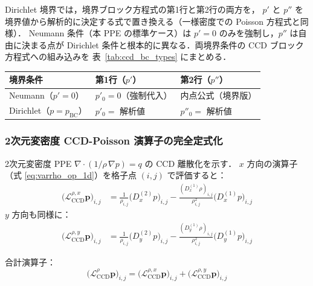 \begin{tcolorbox}[warnbox, title={Dirichlet 境界（$p = p_{\mathrm{BC}}$）の場合との比較}]
Dirichlet 境界では，境界ブロック方程式の第1行と第2行の両方を，
$p'$ と $p''$ を境界値から解析的に決定する式で置き換える（一様密度での Poisson 方程式と同様）．
Neumann 条件（本 PPE の標準ケース）は $p' = 0$ のみを強制し，$p''$ は自由に決まる点が
Dirichlet 条件と根本的に異なる．両境界条件の CCD ブロック方程式への組み込みを
表~\ref{tab:ccd_bc_types} にまとめる．

\begin{center}
\renewcommand{\arraystretch}{1.2}
\begin{tabular}{lll}
\hline
境界条件 & 第1行（$p'$） & 第2行（$p''$） \\
\hline
Neumann（$p'=0$） & $p'_0 = 0$（強制代入） & 内点公式（境界版） \\
Dirichlet（$p=p_{\mathrm{BC}}$） & $p'_0 = $ 解析値 & $p''_0 = $ 解析値 \\
\hline
\end{tabular}
\end{center}
{\captionsetup{hypcap=false}%
%
\label{tab:ccd_bc_types}}
\end{tcolorbox}

\subsubsection{2次元変密度 CCD-Poisson 演算子の完全定式化}
\label{sec:ccd_2d_full}

2次元変密度 PPE $\nabla\cdot(1/\rho\,\nabla p) = q$ の CCD 離散化を示す．
$x$ 方向の演算子（式 \eqref{eq:varrho_op_1d}）を格子点 $(i,j)$ で評価すると：
\begin{align}
  \bigl(\mathcal{L}_{\mathrm{CCD}}^{\rho,x}\bm{p}\bigr)_{i,j}
  &= \frac{1}{\rho_{i,j}}\bigl(D_x^{(2)} p\bigr)_{i,j}
  - \frac{(D_x^{(1)}\rho)_{i,j}}{\rho_{i,j}^2}\bigl(D_x^{(1)} p\bigr)_{i,j}
  \label{eq:Lx_varrho_discrete}
\end{align}
$y$ 方向も同様に：
\begin{align}
  \bigl(\mathcal{L}_{\mathrm{CCD}}^{\rho,y}\bm{p}\bigr)_{i,j}
  &= \frac{1}{\rho_{i,j}}\bigl(D_y^{(2)} p\bigr)_{i,j}
  - \frac{(D_y^{(1)}\rho)_{i,j}}{\rho_{i,j}^2}\bigl(D_y^{(1)} p\bigr)_{i,j}
  \label{eq:Ly_varrho_discrete}
\end{align}

合計演算子：
\begin{equation}
  \bigl(\mathcal{L}_{\mathrm{CCD}}^{\rho}\bm{p}\bigr)_{i,j}
  = \bigl(\mathcal{L}_{\mathrm{CCD}}^{\rho,x}\bm{p}\bigr)_{i,j}
  + \bigl(\mathcal{L}_{\mathrm{CCD}}^{\rho,y}\bm{p}\bigr)_{i,j}
  \label{eq:L_CCD_2d_full}
\end{equation}

